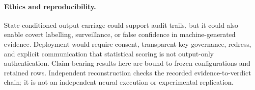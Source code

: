 \paragraph{Ethics and reproducibility.}
State-conditioned output carriage could support audit trails, but it could also
enable covert labelling, surveillance, or false confidence in machine-generated
evidence. Deployment would require consent, transparent key governance,
redress, and explicit communication that statistical scoring is not output-only
authentication. Claim-bearing results here are bound to frozen configurations
and retained rows. Independent reconstruction checks the recorded
evidence-to-verdict chain; it is not an independent neural execution or
experimental replication.

